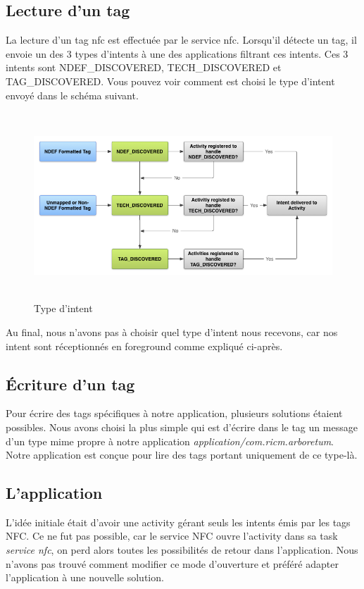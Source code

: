 \documentclass[a4paper,11pt]{article}
\begin{document}
      \subsection{Lecture d’un tag}
      La lecture d’un tag nfc est effectuée par le service nfc. Lorsqu’il détecte un tag, il envoie un des 3 types d’intents à une des applications 
      filtrant ces intents. Ces 3 intents sont NDEF\_DISCOVERED, TECH\_DISCOVERED et TAG\_DISCOVERED. 
      Vous pouvez voir comment est choisi le type d’intent envoyé dans le schéma suivant.
    \begin{figure}[H]
     \begin{center}
      \includegraphics[width=15cm,height=7cm]{nfc_tag_dispatch.png}
      \caption{Type d'intent}
     \end{center}
    \end{figure}
      Au final, nous n’avons pas à choisir quel type d’intent nous recevons, car nos intent sont réceptionnés en foreground comme expliqué ci-après.
      
      \subsection{Écriture d'un tag}
      Pour écrire des tags spécifiques à notre application, plusieurs solutions étaient possibles.
      Nous avons choisi la plus simple qui est d’écrire dans le tag un message d’un type mime propre à notre application \textit{application/com.ricm.arboretum}. 
      Notre application est conçue pour lire des tags portant uniquement de ce type-là.
      
      \subsection{L’application}
      L’idée initiale était d’avoir une activity gérant seuls les intents émis par les tags NFC. 
      Ce ne fut pas possible, car le service NFC ouvre l’activity dans sa task \textit{service nfc}, on perd alors toutes les possibilités de retour 
      dans l’application. 
      Nous n’avons pas trouvé comment modifier ce mode d’ouverture et préféré adapter l’application à une nouvelle solution.
      
\end{document}
